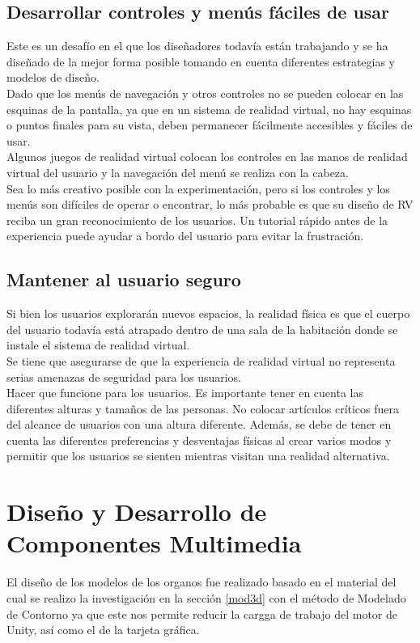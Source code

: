 \subsection{Desarrollar controles y menús fáciles de usar}
Este es un desafío en el que los diseñadores todavía están trabajando y se ha diseñado de la mejor forma posible tomando en cuenta diferentes estrategias y modelos de diseño.\\
Dado que los menús de navegación y otros controles no se pueden colocar en las esquinas de la pantalla, ya que en un sistema de realidad virtual, no hay esquinas o puntos finales 
para su vista, deben permanecer fácilmente accesibles y fáciles de usar.\\
Algunos juegos de realidad virtual colocan los controles en las manos de realidad virtual del usuario y la navegación del menú se realiza con la cabeza.\\
Sea lo más creativo posible con la experimentación, pero si los controles y los menús son difíciles de operar o encontrar, lo más probable es que su diseño de RV reciba un gran 
reconocimiento de los usuarios. Un tutorial rápido antes de la experiencia puede ayudar a bordo del usuario para evitar la frustración.

\subsection{Mantener al usuario seguro}
Si bien los usuarios explorarán nuevos espacios, la realidad física es que el cuerpo del usuario todavía está atrapado dentro de una sala de la habitación donde se instale el sistema 
de realidad virtual.\\
Se tiene que asegurarse de que la experiencia de realidad virtual no representa serias amenazas de seguridad para los usuarios.\\
Hacer que funcione para los usuarios. Es importante tener en cuenta las diferentes alturas y tamaños de las personas. No colocar artículos críticos fuera del alcance de usuarios con 
una altura diferente. Además, se debe de tener en cuenta las diferentes preferencias y desventajas físicas al crear varios modos y permitir que los usuarios se sienten mientras visitan 
una realidad alternativa.

\section{Diseño y Desarrollo de Componentes Multimedia}
El diseño de los modelos de los organos fue realizado basado en el material del cual se realizo la investigación en la sección \ref{mod3d} con el método de
Modelado de Contorno ya que este nos permite reducir la cargga de trabajo del motor de Unity, así como el de la tarjeta gráfica.\\

